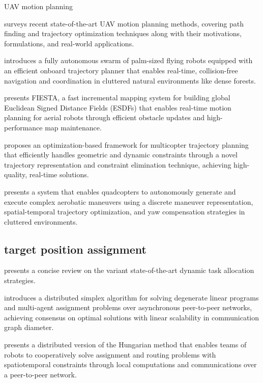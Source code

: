 UAV motion planning

\cite{quan2020survey} surveys recent state-of-the-art UAV motion planning methods, covering path finding and trajectory optimization techniques along with their motivations, formulations, and real-world applications.

\cite{zhou2022swarm} introduces a fully autonomous swarm of palm-sized flying robots equipped with an efficient onboard trajectory planner that enables real-time, collision-free navigation and coordination in cluttered natural environments like dense forests.

\cite{han2019fiesta} presents FIESTA, a fast incremental mapping system for building global Euclidean Signed Distance Fields (ESDFs) that enables real-time motion planning for aerial robots through efficient obstacle updates and high-performance map maintenance.

\cite{wang2022geometrically} proposes an optimization-based framework for multicopter trajectory planning that efficiently handles geometric and dynamic constraints through a novel trajectory representation and constraint elimination technique, achieving high-quality, real-time solutions.

\cite{wang2025unlocking} presents a system that enables quadcopters to autonomously generate and execute complex aerobatic maneuvers using a discrete maneuver representation, spatial-temporal trajectory optimization, and yaw compensation strategies in cluttered environments.


\subsection{target position assignment}

\cite{rm2020review} presents a concise review on the variant state-of-the-art dynamic task allocation strategies.

\cite{burger2012distributed} introduces a distributed simplex algorithm for solving degenerate linear programs and multi-agent assignment problems over asynchronous peer-to-peer networks, achieving consensus on optimal solutions with linear scalability in communication graph diameter.

\cite{chopra2017distributed} presents a distributed version of the Hungarian method that enables teams of robots to cooperatively solve assignment and routing problems with spatiotemporal constraints through local computations and communications over a peer-to-peer network.

